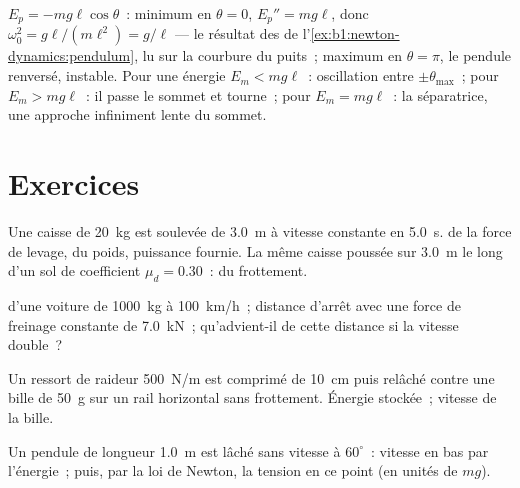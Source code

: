 \begin{example}\label{ex:b1:work-and-energy:pendulum}
$E_p = -mg\ell\cos\theta$~: minimum en $\theta = 0$, $E_p'' = mg\ell$, donc
$\omega_0^2 = g\ell/(m\ell^2) = g/\ell$ --- le résultat des  de l'\cref{ex:b1:newton-dynamics:pendulum}, lu sur la
courbure du puits~; maximum en $\theta = \pi$, le pendule renversé,
instable. Pour une énergie $E_m < mg\ell$~: oscillation entre
$\pm\theta_{\max}$~; pour $E_m > mg\ell$~: il passe le sommet et
tourne~; pour $E_m = mg\ell$~: la séparatrice, une approche
infiniment lente du sommet.
\end{example}

\section{Exercices}

\begin{exercise}[$\star$]\label{exo:b1:work-and-energy:1}
Une caisse de \qty{20}{kg} est soulevée de \qty{3.0}{m} à vitesse
constante en \qty{5.0}{s}.  de la force de levage,  du
poids, puissance fournie. La même caisse poussée sur \qty{3.0}{m} le
long d'un sol de coefficient $\mu_d = 0.30$~:  du frottement.
\end{exercise}

\begin{exercise}[$\star$]\label{exo:b1:work-and-energy:2}
 d'une voiture de \qty{1000}{kg} à \qty{100}{km/h}~;
distance d'arrêt avec une force de freinage constante de \qty{7.0}{kN}~;
qu'advient-il de cette distance si la vitesse double~?
\end{exercise}

\begin{exercise}[$\star$]\label{exo:b1:work-and-energy:3}
Un ressort de raideur \qty{500}{N/m} est comprimé de \qty{10}{cm} puis
relâché contre une bille de \qty{50}{g} sur un rail horizontal sans
frottement. Énergie stockée~; vitesse de la bille.
\end{exercise}

\begin{exercise}[$\star$]\label{exo:b1:work-and-energy:4}
Un pendule de longueur \qty{1.0}{m} est lâché sans vitesse à $60^\circ$~:
vitesse en bas par l'énergie~; puis, par la loi de Newton, la tension en
ce point (en unités de $mg$).
\end{exercise}

